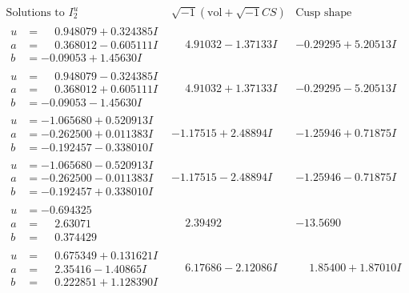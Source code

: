 \documentclass[1p]{elsarticle_modified}
\theoremstyle{definition}
\newcommand{\I}{\sqrt{-1}}
\begin{document}
$$\begin{array}{c|c|c}  
\text{Solutions to }I^u_{2}& \I (\text{vol} + \sqrt{-1}CS) & \text{Cusp shape}\\
 \hline 
\begin{aligned}
u &= \phantom{-}0.948079 + 0.324385 I \\
a &= \phantom{-}0.368012 - 0.605111 I \\
b &= -0.09053 + 1.45630 I\end{aligned}
 & \phantom{-}4.91032 - 1.37133 I & -0.29295 + 5.20513 I \\ \hline\begin{aligned}
u &= \phantom{-}0.948079 - 0.324385 I \\
a &= \phantom{-}0.368012 + 0.605111 I \\
b &= -0.09053 - 1.45630 I\end{aligned}
 & \phantom{-}4.91032 + 1.37133 I & -0.29295 - 5.20513 I \\ \hline\begin{aligned}
u &= -1.065680 + 0.520913 I \\
a &= -0.262500 + 0.011383 I \\
b &= -0.192457 - 0.338010 I\end{aligned}
 & -1.17515 + 2.48894 I & -1.25946 + 0.71875 I \\ \hline\begin{aligned}
u &= -1.065680 - 0.520913 I \\
a &= -0.262500 - 0.011383 I \\
b &= -0.192457 + 0.338010 I\end{aligned}
 & -1.17515 - 2.48894 I & -1.25946 - 0.71875 I \\ \hline\begin{aligned}
u &= -0.694325\phantom{ +0.000000I} \\
a &= \phantom{-}2.63071\phantom{ +0.000000I} \\
b &= \phantom{-}0.374429\phantom{ +0.000000I}\end{aligned}
 & \phantom{-}2.39492\phantom{ +0.000000I} & -13.5690\phantom{ +0.000000I} \\ \hline\begin{aligned}
u &= \phantom{-}0.675349 + 0.131621 I \\
a &= \phantom{-}2.35416 - 1.40865 I \\
b &= \phantom{-}0.222851 + 1.128390 I\end{aligned}
 & \phantom{-}6.17686 - 2.12086 I & \phantom{-}1.85400 + 1.87010 I \\ \hline\begin{aligned}

\end{aligned}
\end{array}$$
\end{document}
